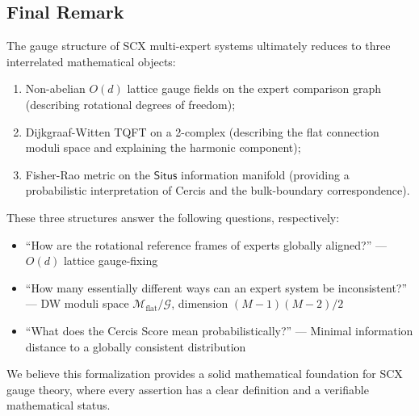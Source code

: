 \documentclass[12pt,a4paper]{article}
\theoremstyle{definition}
\theoremstyle{remark}
\theoremstyle{definition}
\newcommand{\Situs}{\textsf{Situs}}
\newcommand{\Gflatquot}{\mathcal{M}_{\mathrm{flat}}/\mathcal{G}}
\begin{document}
\subsection{Final Remark}

The gauge structure of SCX multi-expert systems ultimately reduces to three interrelated mathematical objects:
\begin{enumerate}[label=(\roman*)]
    \item Non-abelian $O(d)$ lattice gauge fields on the expert comparison graph (describing rotational degrees of freedom);
    \item Dijkgraaf-Witten TQFT on a 2-complex (describing the flat connection moduli space and explaining the harmonic component);
    \item Fisher-Rao metric on the $\Situs$ information manifold (providing a probabilistic interpretation of Cercis and the bulk-boundary correspondence).
\end{enumerate}

These three structures answer the following questions, respectively:
\begin{itemize}
    \item ``How are the rotational reference frames of experts globally aligned?'' — $O(d)$ lattice gauge-fixing
    \item ``How many essentially different ways can an expert system be inconsistent?'' — DW moduli space $\Gflatquot$, dimension $(M-1)(M-2)/2$
    \item ``What does the Cercis Score mean probabilistically?'' — Minimal information distance to a globally consistent distribution
\end{itemize}

We believe this formalization provides a solid mathematical foundation for SCX gauge theory,
where every assertion has a clear definition and a verifiable mathematical status.

\newpage
\end{document}
